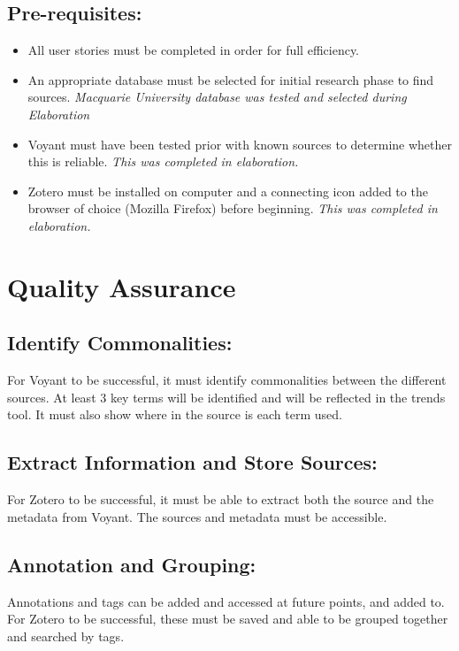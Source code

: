 \documentclass{article}
\begin{document}
\subsection{Pre-requisites:}
\begin{itemize}
    \item All user stories must be completed in order for full efficiency. 
    \item An appropriate database must be selected for initial research phase to find sources. \textit{Macquarie University database was tested and selected during Elaboration}
    \item Voyant must have been tested prior with known sources to determine whether this is reliable. \textit{This was completed in elaboration.}
    \item Zotero must be installed on computer and a connecting icon added to the browser of choice (Mozilla Firefox) before beginning. \textit{This was completed in elaboration.}
    \end{itemize}
    
\section{Quality Assurance}
\subsection{Identify Commonalities:}
For Voyant to be successful, it must identify commonalities between the different sources. At least 3 key terms will be identified and will be reflected in the trends tool. It must also show where in the source is each term used.

\subsection{Extract Information and Store Sources:}
For Zotero to be successful, it must be able to extract both the source and the metadata from Voyant. The sources and metadata must be accessible. 

\subsection{Annotation and Grouping:}
Annotations and tags can be added and accessed at future points, and added to. For Zotero to be successful, these must be saved and able to be grouped together and searched by tags.
\end{document}
